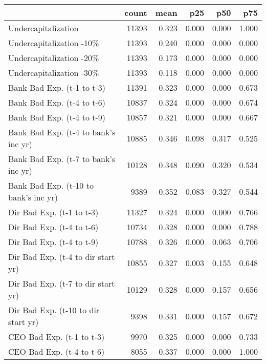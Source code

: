 \setlength{\tabcolsep}{4pt}
\begin{longtable}{l*{1}{rrrrr}}
\toprule
                    &       count&        mean&         p25&         p50&         p75\\
\midrule
Undercapitalization &       11393&       0.323&       0.000&       0.000&       1.000\\
Undercapitalization -10\%&       11393&       0.240&       0.000&       0.000&       0.000\\
Undercapitalization -20\%&       11393&       0.173&       0.000&       0.000&       0.000\\
Undercapitalization -30\%&       11393&       0.118&       0.000&       0.000&       0.000\\
Bank Bad Exp. (t-1 to t-3)&       11391&       0.323&       0.000&       0.000&       0.673\\
Bank Bad Exp. (t-4 to t-6)&       10837&       0.324&       0.000&       0.000&       0.674\\
Bank Bad Exp. (t-4 to t-9)&       10857&       0.321&       0.000&       0.000&       0.667\\
Bank Bad Exp. (t-4 to bank’s inc yr)&       10885&       0.346&       0.098&       0.317&       0.525\\
Bank Bad Exp. (t-7 to bank’s inc yr)&       10128&       0.348&       0.090&       0.320&       0.534\\
Bank Bad Exp. (t-10 to bank’s inc yr)&        9389&       0.352&       0.083&       0.327&       0.544\\
Dir Bad Exp. (t-1 to t-3)&       11327&       0.324&       0.000&       0.000&       0.766\\
Dir Bad Exp. (t-4 to t-6)&       10734&       0.328&       0.000&       0.000&       0.788\\
Dir Bad Exp. (t-4 to t-9)&       10788&       0.326&       0.000&       0.063&       0.706\\
Dir Bad Exp. (t-4 to dir start yr)&       10855&       0.327&       0.003&       0.155&       0.648\\
Dir Bad Exp. (t-7 to dir start yr)&       10129&       0.328&       0.000&       0.157&       0.656\\
Dir Bad Exp. (t-10 to dir start yr)&        9398&       0.331&       0.000&       0.157&       0.672\\
CEO Bad Exp. (t-1 to t-3)&        9970&       0.325&       0.000&       0.000&       0.733\\
CEO Bad Exp. (t-4 to t-6)&        8055&       0.337&       0.000&       0.000&       1.000\\

\end{longtable}
